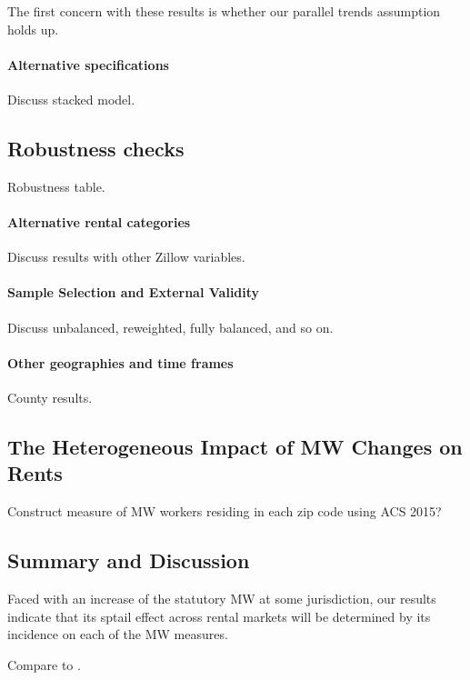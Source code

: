 The first concern with these results is whether our parallel trends assumption 
holds up.

\paragraph{Alternative specifications}

Discuss stacked model.

\subsection{Robustness checks}\label{sec:robustness_results}

Robustness table.

\paragraph{Alternative rental categories}

Discuss results with other Zillow variables.

\paragraph{Sample Selection and External Validity}

Discuss unbalanced, reweighted, fully balanced, and so on.

\paragraph{Other geographies and time frames}

County results.

\subsection{The Heterogeneous Impact of MW Changes on Rents}
\label{sec:heterogeneity_results}

Construct measure of MW workers residing in each zip code using ACS 2015?

\subsection{Summary and Discussion}
\label{sec:results_discussion}

Faced with an increase of the statutory MW at some jurisdiction, our results
indicate that its sptail effect across rental markets will be determined by 
its incidence on each of the MW measures.


Compare to \textcite{Yamagishi2019}.
